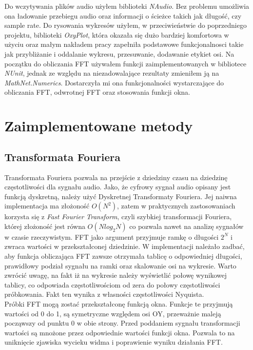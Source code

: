 \documentclass{article}
\begin{document}
Do wczytywania plików audio użyłem biblioteki \textit{NAudio}. Bez problemu umożliwia ona ładowanie przebiegu audio oraz informacji o ścieżce takich jak długość, czy sample rate. Do rysowania wykresów użyłem, w przeciwieństwie do poprzedniego projektu, biblioteki \textit{OxyPlot}, która okazała się dużo bardziej komfortowa w użyciu oraz małym nakładem pracy zapełniła podstawowe funkcjonalnosci takie jak przybliżanie i oddalanie wykresu, przesuwanie, dodawanie etykiet osi. Na początku do obliczania FFT używałem funkcji zaimplementowanych w bibliotece \textit{NUnit}, jednak ze względu na niezadowalające rezultaty zmieniłem ją na \textit{MathNet.Numerics}. Dostarczyła mi ona funkcjonalności wystarczające do obliczania FFT, odwrotnej FFT oraz stosowania funkcji okna.

\section{Zaimplementowane metody}
\subsection{Transformata Fouriera}
\label{subsection:FFT}

Transformata Fouriera pozwala na przejście z dziedziny czasu na dziedzinę częstotliwości dla sygnału audio. Jako, że cyfrowy sygnał audio opisany jest funkcją dyskretną, należy użyć Dyskretnej Transformaty Fouriera. Jej naiwna implementacja ma złożoność $O(N^2)$, zatem w praktycznych zastosowaniach korzysta się z \textit{Fast Fourier Transform}, czyli szybkiej transformacji Fouriera, której złożoność jest równa $O(Nlog_2N)$ co pozwala nawet na analizę sygnałów w czasie rzeczywistym. FFT jako argument przyjmuje ramkę o długości $2^N$ i zwraca wartości w przekształconej dziedzinie. W implementacji należało zadbać, aby funkcja obliczająca FFT zawsze otrzymała tablicę o odpowiedniej długości, prawidłowy podział sygnału na ramki oraz skalowanie osi na wykresie. Warto zwrócić uwagę, na fakt iż na wykresie należy wyświetlić połowę wynikowej tablicy, co odpowiada częstotliwościom od zera do połowy częstotliwości próbkowania. Fakt ten wynika z własności częstotliwości Nyquista.
\\

Próbki FFT mogą zostać przekształconę funkcją okna. Funkcje te przyjmują wartości od 0 do 1, są symetryczne względem osi OY, przeważnie maleją począwszy od punktu 0 w obie strony. Przed poddaniem sygnału transformacji wartości są mnożone przez odpowiednie wartości funkcji okna. Pozwala to na uniknięcie zjawiska wycieku widma i poprawienie wyniku działania FFT. 
\end{document}
